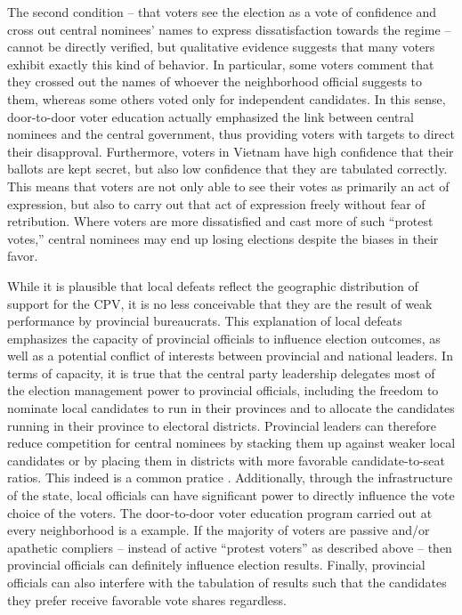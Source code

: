 \documentclass[12pt]{article}\usepackage[]{graphicx}\usepackage[]{color}
\newcommand{\1}{\mathbbm{1}}
\begin{document}
The second condition -- that voters see the election as a vote of confidence and cross out central nominees' names to express dissatisfaction towards the regime -- cannot be directly verified, but qualitative evidence suggests that many voters exhibit exactly this kind of behavior. In particular, some voters comment that they crossed out the names of whoever the neighborhood official suggests to them, whereas some others voted only for independent candidates. In this sense, door-to-door voter education actually emphasized the link between central nominees and the central government, thus providing voters with targets to direct their disapproval. Furthermore, voters in Vietnam have high confidence that their ballots are kept secret, but also low confidence that they are tabulated correctly. This means that voters are not only able to see their votes as primarily an act of expression, but also to carry out that act of expression freely without fear of retribution. Where voters are more dissatisfied and cast more of such ``protest votes,'' central nominees may end up losing elections despite the biases in their favor.

While it is plausible that local defeats reflect the geographic distribution of support for the CPV, it is no less conceivable that they are the result of weak performance by provincial bureaucrats. This explanation of local defeats emphasizes the capacity of provincial officials to influence election outcomes, as well as a potential conflict of interests between provincial and national leaders. In terms of capacity, it is true that the central party leadership delegates most of the election management power to provincial officials, including the freedom to nominate local candidates to run in their provinces and to allocate the candidates running in their province to electoral districts. Provincial leaders can therefore reduce competition for central nominees by stacking them up against weaker local candidates or by placing them in districts with more favorable candidate-to-seat ratios. This indeed is a common pratice \cite[provided evidence for the 2007 election, which I replicated successfully for the 2011 and 2016 elections]{MaleskySchuler2011}.  Additionally, through the infrastructure of the state, local officials can have significant power to directly influence the vote choice of the voters. The door-to-door voter education program carried out at every neighborhood is a example. If the majority of voters are passive and/or apathetic compliers -- instead of active ``protest voters'' as described above -- then provincial officials can definitely influence election results. Finally, provincial officials can also interfere with the tabulation of results such that the candidates they prefer receive favorable vote shares regardless. 
\end{document}

